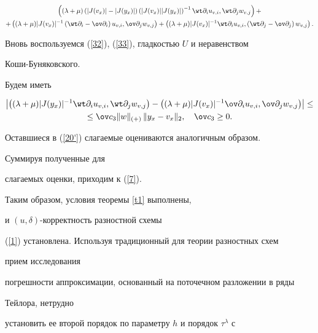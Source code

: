 {\begin{multline*}
\Scal{(\lambda+\mu)


\left(|J(v_x)|-|J(y_x)|\right)\left(|J(v_x)||J(y_x)|\right)^{-1}


\wt \partial_{i}u_{v,i},\wt \partial_{j}w_{v,j}}+\\


+\Scal{(\lambda+\mu)|J(v_x)|^{-1} \left(\wt \partial_{i}-


\ov \partial_{i}\right)u_{v,i},\ov \partial_{j}w_{v,j}}+


\Scal{(\lambda+\mu)|J(v_x)|^{-1} \wt \partial_{i}u_{v,i},


\left(\wt \partial_{j}-\ov \partial_{j}\right)w_{v,j}}.


\end{multline*}


Вновь воспользуемся (\ref{32}), (\ref{33}), гладкостью $U$ и неравенством 


Коши-Буняковского. 


Будем иметь


\begin{multline*}


\left| {\Scal{(\lambda+\mu)|J(y_x)|^{-1} \wt \partial_{i}u_{v,i},


\wt\partial_{j}w_{v,j}}-\Scal{(\lambda+\mu)|J(v_x)|^{-1}


\ov \partial_{i}u_{v,i},\ov \partial_{j}w_{v,j}}} \right| \leq \\


\leq \ov c_3 \|w\|_{(+)}\,\|y_x-v_x\|_2,\quad \ov c_3\ge 0.


\end{multline*}


Оставшиеся в (\ref{20'}) слагаемые оцениваются аналогичным образом. 


Суммируя полученные для


слагаемых оценки, приходим к (\ref{7}). 





Таким образом, условия теоремы \ref{t1} выполнены,


и $(u,\delta)$-корректность разностной схемы 


(\ref{1}) установлена. Используя традиционный для теории разностных схем 


прием исследования


погрешности аппроксимации, основанный на поточечном разложении в ряды 


Тейлора, нетрудно 


установить ее второй порядок по параметру $h$ и порядок $\tau^\lambda$ с 


}
